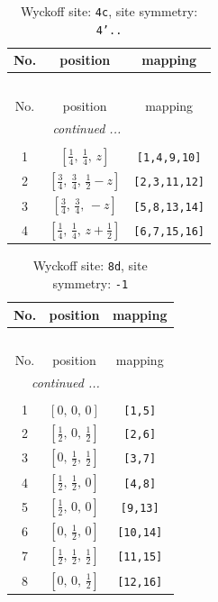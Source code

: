\documentclass[fleqn,8pt]{jsarticle}
\begin{document}
\renewcommand{\arraystretch}{1.2}
\begin{longtable}{ccc}
\caption{Wyckoff site: {\tt 4c}, site symmetry: {\tt 4'..}}
 \\
 \hline \hline
No. & position & mapping \\ \hline \endfirsthead

\multicolumn{2}{l}{\tablename\ \thetable{}} \\
 \hline \hline
No. & position & mapping \\ \hline \endhead

 \hline \hline
\multicolumn{2}{r}{\footnotesize\it continued ...} \\ \endfoot

 \hline \hline
\multicolumn{2}{r}{} \\ \endlastfoot

1 & $\left[ \frac{1}{4},\, \frac{1}{4},\, z \right]$ & {\tt [1,4,9,10]} \\ \hline
2 & $\left[ \frac{3}{4},\, \frac{3}{4},\, \frac{1}{2} - z \right]$ & {\tt [2,3,11,12]} \\ \hline
3 & $\left[ \frac{3}{4},\, \frac{3}{4},\, - z \right]$ & {\tt [5,8,13,14]} \\ \hline
4 & $\left[ \frac{1}{4},\, \frac{1}{4},\, z + \frac{1}{2} \right]$ & {\tt [6,7,15,16]} \\
\end{longtable}
\renewcommand{\arraystretch}{1.2}
\begin{longtable}{ccc}
\caption{Wyckoff site: {\tt 8d}, site symmetry: {\tt -1}}
 \\
 \hline \hline
No. & position & mapping \\ \hline \endfirsthead

\multicolumn{2}{l}{\tablename\ \thetable{}} \\
 \hline \hline
No. & position & mapping \\ \hline \endhead

 \hline \hline
\multicolumn{2}{r}{\footnotesize\it continued ...} \\ \endfoot

 \hline \hline
\multicolumn{2}{r}{} \\ \endlastfoot

1 & $\left[ 0,\, 0,\, 0 \right]$ & {\tt [1,5]} \\ \hline
2 & $\left[ \frac{1}{2},\, 0,\, \frac{1}{2} \right]$ & {\tt [2,6]} \\ \hline
3 & $\left[ 0,\, \frac{1}{2},\, \frac{1}{2} \right]$ & {\tt [3,7]} \\ \hline
4 & $\left[ \frac{1}{2},\, \frac{1}{2},\, 0 \right]$ & {\tt [4,8]} \\ \hline
5 & $\left[ \frac{1}{2},\, 0,\, 0 \right]$ & {\tt [9,13]} \\ \hline
6 & $\left[ 0,\, \frac{1}{2},\, 0 \right]$ & {\tt [10,14]} \\ \hline
7 & $\left[ \frac{1}{2},\, \frac{1}{2},\, \frac{1}{2} \right]$ & {\tt [11,15]} \\ \hline
8 & $\left[ 0,\, 0,\, \frac{1}{2} \right]$ & {\tt [12,16]} \\
\end{longtable}
\end{document}
